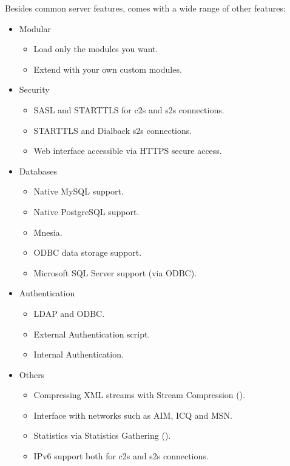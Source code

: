 Besides common \Jabber{} server features, \ejabberd{} comes with a wide range of other features:
\begin{itemize}
\item Modular
\begin{itemize}
\item Load only the modules you want.
\item Extend \ejabberd{} with your own custom modules.
\end{itemize}
\item Security
\begin{itemize}
\item SASL and STARTTLS for c2s and s2s connections.\improved{}
\item STARTTLS and Dialback s2s connections.
\item Web interface accessible via HTTPS secure access.
\end{itemize}
\item Databases
\begin{itemize}
\item Native MySQL support.\new{}
\item Native PostgreSQL support.
\item Mnesia.
\item ODBC data storage support. 
\item Microsoft SQL Server support (via ODBC).\new{}
\end{itemize}
\item Authentication
\begin{itemize}
\item LDAP and ODBC. 
\item External Authentication script.
\item Internal Authentication.
\end{itemize}
\item Others
\begin{itemize}
\item Compressing XML streams with Stream Compression ().\new{}
\item Interface with networks such as AIM, ICQ and MSN.
\item Statistics via Statistics Gathering ().
\item IPv6 support both for c2s and s2s connections.

\end{itemize}
\end{itemize}
